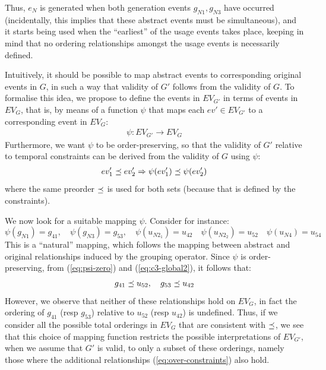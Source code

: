 Thus, $e_{N}$ is generated when both generation events $g_{N1}, g_{N3}$ have occurred (incidentally, this implies that these abstract events must be simultaneous), and it starts being used when the ``earliest'' of the usage events takes place, keeping in mind that no ordering relationships amongst the usage events is necessarily defined.

Intuitively, it should be possible to map abstract events to corresponding  original events in $G$, in such a way that validity of $G'$ follows from the validity of $G$.
%
To formalise this idea, we propose to define the  events in $EV_{G'}$ in terms of events in $EV_{G}$, that is, by means of a function $\psi$ that maps each $ev' \in EV_{G'}$ to a corresponding event in $EV_{G}$:
\begin{align}
 \psi: EV_{G'} \rightarrow EV_{G} 
\end{align}
Furthermore, we want $\psi$ to be order-preserving, so that the validity of $G'$ relative to temporal constraints can be derived from the validity of $G$ using $\psi$: 
\begin{align}
 ev_1' \preceq ev_2' \Rightarrow \psi(ev_1') \preceq \psi(ev_2')  
\end{align}
where the same preorder $\preceq$ is used for both sets (because that is defined by the constraints).

We now look for a suitable mapping $\psi$. Consider for instance:
\begin{equation}
\psi(g_{N1}) = g_{41} ,  \quad  \psi(g_{N3}) =  g_{53},  \quad   \psi(u_{N2_1}) = u_{42}  \quad \psi(u_{N2_2}) = u_{52} \quad \psi(u_{N4}) = u_{54} \label{eq:psi-zero}
\end{equation}
This is a ``natural'' mapping, which follows the mapping between abstract and original relationships induced by the grouping operator.
Since $\psi$ is order-preserving, from (\ref{eq:psi-zero}) and (\ref{eq:c3-global2}), it follows that:
\begin{equation}
  g_{41} \preceq   u_{52}, \quad  g_{53} \preceq   u_{42}
  \label{eq:over-constraints}
  \end{equation}
However, we observe that neither of these relationships hold on $EV_G$, in fact the ordering of $g_{41}$ (resp $g_{53}$) relative to $u_{52}$ (resp $u_{42}$) is undefined.
Thus, if we consider all the possible total orderings in $EV_G$ that are consistent with $\preceq$, we see that this choice of mapping function restricts the possible interpretations of $EV_{G'}$, when we assume that $G'$ is valid, to only a subset of these orderings, namely those where the additional relationships (\ref{eq:over-constraints}) also hold.

